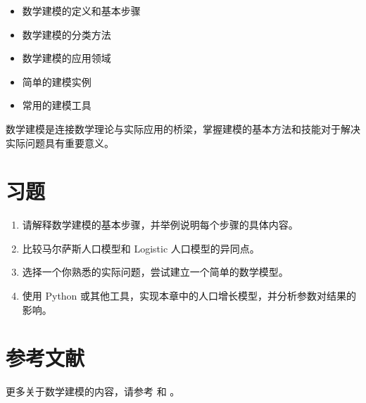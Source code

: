 \begin{itemize}
    \item 数学建模的定义和基本步骤
    \item 数学建模的分类方法
    \item 数学建模的应用领域
    \item 简单的建模实例
    \item 常用的建模工具
\end{itemize}

\begin{definitionbox}[title=本章要点]
数学建模是连接数学理论与实际应用的桥梁，掌握建模的基本方法和技能对于解决实际问题具有重要意义。
\end{definitionbox}

\section*{习题}

\begin{enumerate}
    \item 请解释数学建模的基本步骤，并举例说明每个步骤的具体内容。
    
    \item 比较马尔萨斯人口模型和 Logistic 人口模型的异同点。
    
    \item 选择一个你熟悉的实际问题，尝试建立一个简单的数学模型。
    
    \item 使用 Python 或其他工具，实现本章中的人口增长模型，并分析参数对结果的影响。
\end{enumerate}

\section*{参考文献}

更多关于数学建模的内容，请参考 \cite{giordano2014first} 和 \cite{meerschaert2007mathematical}。 